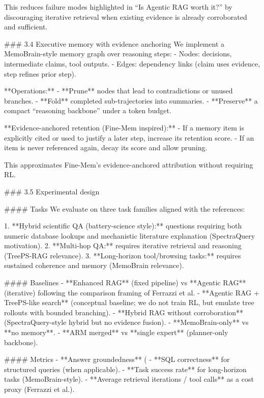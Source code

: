This reduces failure modes highlighted in “Is Agentic RAG worth it?” by discouraging iterative retrieval when existing evidence is already corroborated and sufficient.

### 3.4 Executive memory with evidence anchoring  
We implement a MemoBrain-style memory graph over reasoning steps:
- Nodes: decisions, intermediate claims, tool outputs.  
- Edges: dependency links (claim uses evidence, step refines prior step).

**Operations:**
- **Prune** nodes that lead to contradictions or unused branches.  
- **Fold** completed sub-trajectories into summaries.  
- **Preserve** a compact “reasoning backbone” under a token budget.

**Evidence-anchored retention (Fine-Mem inspired):**
- If a memory item is explicitly cited or used to justify a later step, increase its retention score.  
- If an item is never referenced again, decay its score and allow pruning.

This approximates Fine-Mem’s evidence-anchored attribution without requiring RL.

### 3.5 Experimental design  

#### Tasks  
We evaluate on three task families aligned with the references:

1. **Hybrid scientific QA (battery-science style):** questions requiring both numeric database lookups and mechanistic literature explanation (SpectraQuery motivation).  
2. **Multi-hop QA:** requires iterative retrieval and reasoning (TreePS-RAG relevance).  
3. **Long-horizon tool/browsing tasks:** requires sustained coherence and memory (MemoBrain relevance).

#### Baselines  
- **Enhanced RAG** (fixed pipeline) vs **Agentic RAG** (iterative) following the comparison framing of Ferrazzi et al.  
- **Agentic RAG + TreePS-like search** (conceptual baseline; we do not train RL, but emulate tree rollouts with bounded branching).  
- **Hybrid RAG without corroboration** (SpectraQuery-style hybrid but no evidence fusion).  
- **MemoBrain-only** vs **no memory**.  
- **ARM merged** vs **single expert** (planner-only backbone).

#### Metrics  
- **Answer groundedness** (%
- **SQL correctness** for structured queries (when applicable).  
- **Task success rate** for long-horizon tasks (MemoBrain-style).  
- **Average retrieval iterations / tool calls** as a cost proxy (Ferrazzi et al.).  

